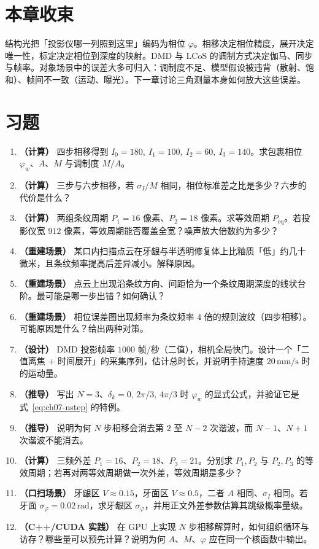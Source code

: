 \section*{本章收束}
结构光把「投影仪哪一列照到这里」编码为相位 $\varphi$。相移决定相位精度，展开决定唯一性，标定决定相位到深度的映射。DMD 与 LCoS 的调制方式决定伽马、同步与帧率。对象场景中的误差大多可归入：调制度不足、模型假设被违背（散射、饱和）、帧间不一致（运动、曝光）。下一章讨论三角测量本身如何放大这些误差。

\section{习题}
\label{sec:ch06-exercises}

\begin{enumerate}
  \item \textbf{（计算）} 四步相移得到 $I_0=180,\ I_1=100,\ I_2=60,\ I_3=140$。求包裹相位 $\varphi_w$、$A$、$M$ 与调制度 $M/A$。
  \item \textbf{（计算）} 三步与六步相移，若 $\sigma_I/M$ 相同，相位标准差之比是多少？六步的代价是什么？
  \item \textbf{（计算）} 两组条纹周期 $P_1=16$ 像素、$P_2=18$ 像素。求等效周期 $P_{\mathrm{eq}}$。若投影仪宽 $912$ 像素，等效周期能否覆盖全宽？噪声放大倍数约为多少？
  \item \textbf{（重建场景）} 某口内扫描点云在牙龈与半透明修复体上比釉质「低」约几十微米，且条纹频率提高后差异减小。解释原因。
  \item \textbf{（重建场景）} 点云上出现沿条纹方向、间距恰为一个条纹周期深度的线状台阶。最可能是哪一步出错？如何确认？
  \item \textbf{（重建场景）} 相位误差图出现频率为条纹频率 $4$ 倍的规则波纹（四步相移）。可能原因是什么？给出两种对策。
  \item \textbf{（设计）} DMD 投影帧率 $1000$ 帧/秒（二值），相机全局快门。设计一个「二值离焦 + 时间展开」的采集序列，估计总时长，并说明手持速度 $20\,\mathrm{mm/s}$ 时的运动量。
  \item \textbf{（推导）} 写出 $N=3$、$\delta_k=0,\,2\pi/3,\,4\pi/3$ 时 $\varphi_w$ 的显式公式，并验证它是式~\eqref{eq:ch07-nstep} 的特例。
  \item \textbf{（推导）} 说明为何 $N$ 步相移会消去第 $2$ 至 $N-2$ 次谐波，而 $N-1$、$N+1$ 次谐波不能消去。
  \item \textbf{（计算）} 三频外差 $P_1=16$、$P_2=18$、$P_3=21$。分别求 $P_1,P_2$ 与 $P_2,P_3$ 的等效周期；若再对两等效周期做一次外差，等效周期是多少？
  \item \textbf{（口扫场景）} 牙龈区 $V\approx0.15$，牙面区 $V\approx0.5$，二者 $A$ 相同、$\sigma_I$ 相同。若牙面 $\sigma_\varphi=0.02\,\mathrm{rad}$，求牙龈区 $\sigma_\varphi$，并用正文外差参数估算其跳级概率量级。
  \item \textbf{（C++/CUDA 实践）} 在 GPU 上实现 $N$ 步相移解算时，如何组织循环与访存？哪些量可以预先计算？说明为何 $A$、$M$、$\varphi$ 应在同一个核函数中输出。
\end{enumerate}

